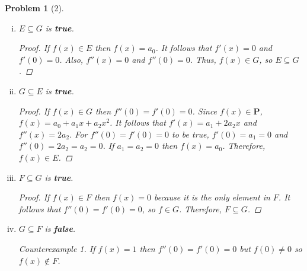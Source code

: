 \documentclass{article}
\theoremstyle{problem}
\newtheorem{prob}{Problem}
\theoremstyle{plain}
\theoremstyle{remark}
\newtheorem{countex}{Counterexample}
\begin{document}
\begin{prob}[2]
\begin{enumerate}[a)]
\begin{enumerate}[i.]
\begin{proof}
          \end{proof}
        \item $E \subseteq G$ is \textbf{true}.
          \begin{proof}
            If $f(x) \in E$ then $f(x) = a_0$. It follows that $f'(x) = 0$ and $f'(0) = 0$. Also, $f''(x) = 0$ and $f''(0) = 0$. Thus, $f(x) \in G$, so $E \subseteq G$.
          \end{proof}
        \item $G \subseteq E$ is \textbf{true}.
          \begin{proof}
            If $f(x) \in G$ then $f''(0) = f'(0) = 0$. Since $f(x) \in \mathbf{P}$, $f(x) = a_0 + a_1x + a_2x^2$. It follows that $f'(x) = a_1 + 2a_2x$ and $f''(x) = 2a_2$. For $f''(0) = f'(0) =0$ to be true, $f'(0) = a_1 = 0$ and $f''(0) = 2a_2 = a_2 = 0$. If $a_1 = a_2 = 0$ then $f(x) = a_0$. Therefore, $f(x) \in E$.
          \end{proof}
        \item $F \subseteq G$ is \textbf{true}.
          \begin{proof}
            If $f(x) \in F$ then $f(x) = 0$ because it is the only element in $F$. It follows that $f''(0) = f'(0) = 0$, so $f \in G$. Therefore, $F \subseteq G$.
          \end{proof}
        \item $G \subseteq F$ is \textbf{false}.
          \begin{countex}
            If $f(x) = 1$ then $f''(0) = f'(0) = 0$ but $f(0) \not = 0$ so $f(x) \not \in F$.
          \end{countex}
        \end{enumerate}    
    \end{enumerate}
    \end{prob}
\end{document}
